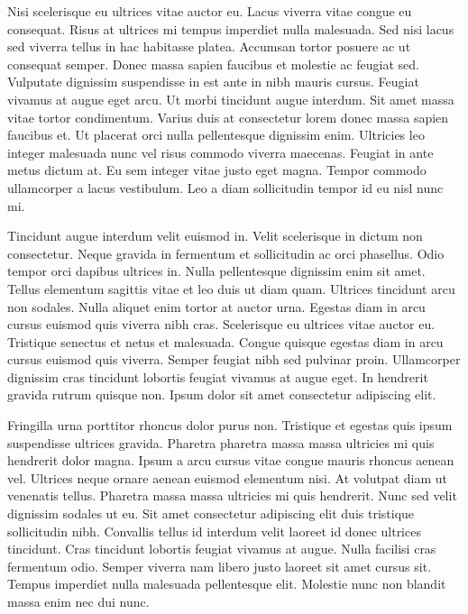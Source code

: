 \documentclass[11pt,a4paper]{article}
\begin{document}
Nisi scelerisque eu ultrices vitae auctor eu. Lacus viverra vitae congue eu consequat. Risus at ultrices mi tempus imperdiet nulla malesuada. Sed nisi lacus sed viverra tellus in hac habitasse platea. Accumsan tortor posuere ac ut consequat semper. Donec massa sapien faucibus et molestie ac feugiat sed. Vulputate dignissim suspendisse in est ante in nibh mauris cursus. Feugiat vivamus at augue eget arcu. Ut morbi tincidunt augue interdum. Sit amet massa vitae tortor condimentum. Varius duis at consectetur lorem donec massa sapien faucibus et. Ut placerat orci nulla pellentesque dignissim enim. Ultricies leo integer malesuada nunc vel risus commodo viverra maecenas. Feugiat in ante metus dictum at. Eu sem integer vitae justo eget magna. Tempor commodo ullamcorper a lacus vestibulum. Leo a diam sollicitudin tempor id eu nisl nunc mi.

Tincidunt augue interdum velit euismod in. Velit scelerisque in dictum non consectetur. Neque gravida in fermentum et sollicitudin ac orci phasellus. Odio tempor orci dapibus ultrices in. Nulla pellentesque dignissim enim sit amet. Tellus elementum sagittis vitae et leo duis ut diam quam. Ultrices tincidunt arcu non sodales. Nulla aliquet enim tortor at auctor urna. Egestas diam in arcu cursus euismod quis viverra nibh cras. Scelerisque eu ultrices vitae auctor eu. Tristique senectus et netus et malesuada. Congue quisque egestas diam in arcu cursus euismod quis viverra. Semper feugiat nibh sed pulvinar proin. Ullamcorper dignissim cras tincidunt lobortis feugiat vivamus at augue eget. In hendrerit gravida rutrum quisque non. Ipsum dolor sit amet consectetur adipiscing elit.

Fringilla urna porttitor rhoncus dolor purus non. Tristique et egestas quis ipsum suspendisse ultrices gravida. Pharetra pharetra massa massa ultricies mi quis hendrerit dolor magna. Ipsum a arcu cursus vitae congue mauris rhoncus aenean vel. Ultrices neque ornare aenean euismod elementum nisi. At volutpat diam ut venenatis tellus. Pharetra massa massa ultricies mi quis hendrerit. Nunc sed velit dignissim sodales ut eu. Sit amet consectetur adipiscing elit duis tristique sollicitudin nibh. Convallis tellus id interdum velit laoreet id donec ultrices tincidunt. Cras tincidunt lobortis feugiat vivamus at augue. Nulla facilisi cras fermentum odio. Semper viverra nam libero justo laoreet sit amet cursus sit. Tempus imperdiet nulla malesuada pellentesque elit. Molestie nunc non blandit massa enim nec dui nunc.
\end{document}
